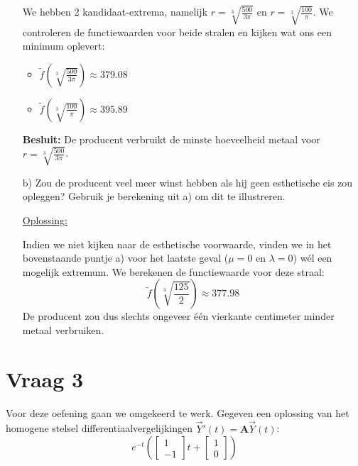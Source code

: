 \documentclass[kulak]{kulakarticle} %
\begin{document}
\begin{enumerate}
	We hebben 2 kandidaat-extrema, namelijk \(r=\sqrt[3]{\frac{500}{3\pi}}\) en \(r=\sqrt[3]{\frac{100}{\pi}}\). We controleren de functiewaarden voor beide stralen en kijken wat ons een minimum oplevert:
	\begin{itemize}
		\item \(\tilde{f}\left(\sqrt[3]{\frac{500}{3\pi}}\right) \approx 379.08 \)
		\item \(\tilde{f}\left(\sqrt[3]{\frac{100}{\pi}}\right) \approx 395.89 \)
	\end{itemize}

	\textbf{Besluit:}
	De producent verbruikt de minste hoeveelheid metaal voor \(r=\sqrt[3]{\frac{500}{3\pi}}\).

	\item[b)] Zou de producent veel meer winst hebben als hij geen esthetische eis zou opleggen? Gebruik je berekening uit a) om dit te illustreren.

	\underline{Oplossing:}

	Indien we niet kijken naar de esthetische voorwaarde, vinden we in het bovenstaande puntje a) voor het laatste geval (\(\mu=0\) en \(\lambda=0\)) wél een mogelijk extremum.
	We berekenen de functiewaarde voor deze straal:
	\[\tilde{f}\left(\sqrt[3]{\frac{125}{2}}\right) \approx 377.98\]
	De producent zou dus slechts ongeveer één vierkante centimeter minder metaal verbruiken.
\end{enumerate}

\newpage

\section*{Vraag 3}

Voor deze oefening gaan we omgekeerd te werk. Gegeven een oplossing van het homogene stelsel differentiaalvergelijkingen \(\vec{Y}'(t)=\textbf{A}\vec{Y}(t)\):
\[e^{-t}\left( \left[\begin{matrix}
	1\\
	-1
\end{matrix}\right]t + \left[ \begin{matrix}
1 \\
0
\end{matrix} \right] \right)\]
\end{document}
